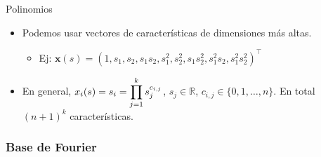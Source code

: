 \documentclass[10pt, envcountsect, handout, aspectratio=1610, hyperref={hypertexnames=true}]{beamer}
\begin{document}
\begin{frame}{Polinomios}
\begin{itemize}
		\item Podemos usar vectores de características de dimensiones más altas.
			\begin{itemize}
				\item Ej: \(\mathbf{x}(s) = (1, s_1, s_2, s_1 s_2, s_1^2, s_2^2, s_1 s_2^2, s_1^2 s_2, s_1^2 s_2^2)^\top\)
			\end{itemize}
			
		\item En general, $\displaystyle x_i(s) = s_i = \prod_{j=1}^k s_j^{c_{i,j}}$, $s_j\in\mathbb{R}$,  $c_{i,j} \in \{0, 1, \ldots, n\}$. En total $(n+1)^k$ características.
	\end{itemize}

\end{frame}


\subsubsection{Base de Fourier}



\end{document}
